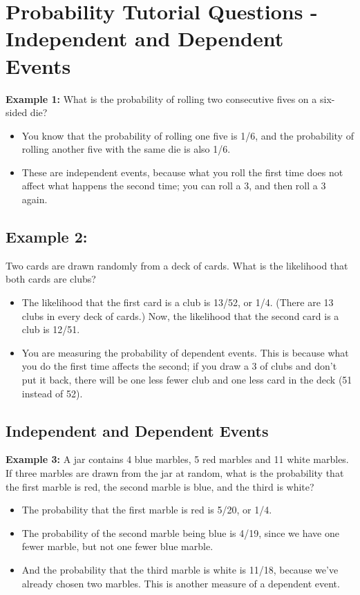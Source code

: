 \documentclass[]{report}
\begin{document}
\section{Probability Tutorial Questions -Independent and Dependent Events}

\textbf{Example 1:} What is the probability of rolling two consecutive fives on a six-sided die?
\begin{itemize}
	\item You know that the probability of rolling one five is 1/6, and the probability of rolling another five with the same die is also 1/6.
	\item These are independent events, because what you roll the first time does not affect what happens the second time; you can roll a 3, and then roll a 3 again.
\end{itemize}


\subsection{Example 2:} Two cards are drawn randomly from a deck of cards. What is the likelihood that both cards are clubs?
\begin{itemize}
	\item The likelihood that the first card is a club is 13/52, or 1/4. (There are 13 clubs in every deck of cards.) Now, the likelihood that the second card is a club is 12/51.
	\item You are measuring the probability of dependent events. This is because what you do the first time affects the second; if you draw a 3 of clubs and don't put it back, there will be one less fewer club and one less card in the deck (51 instead of 52).
\end{itemize}


\subsection{Independent and Dependent Events}

\textbf{Example 3:} A jar contains 4 blue marbles, 5 red marbles and 11 white marbles. If three marbles are drawn from the jar at random, what is the probability that the first marble is red, the second marble is blue, and the third is white?
\begin{itemize}
	\item The probability that the first marble is red is 5/20, or 1/4. 
	\item The probability of the second marble being blue is 4/19, since we have one fewer marble, but not one fewer blue marble. 
	\item And the probability that the third marble is white is 11/18, because we've already chosen two marbles. This is another measure of a dependent event.
\end{itemize}
\end{document}

